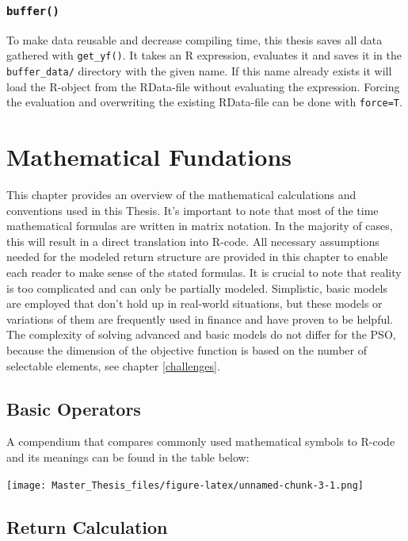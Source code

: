 \documentclass[
  oneside]{book}
\begin{document}
\hypertarget{buffer}{%
\subsection{\texorpdfstring{\texttt{buffer()}}{buffer()}}\label{buffer}}

To make data reusable and decrease compiling time, this thesis saves all data gathered with \texttt{get\_yf()}. It takes an R expression, evaluates it and saves it in the \texttt{buffer\_data/} directory with the given name. If this name already exists it will load the R-object from the RData-file without evaluating the expression. Forcing the evaluation and overwriting the existing RData-file can be done with \texttt{force=T}.

\hypertarget{mathfundations}{%
\chapter{Mathematical Fundations}\label{mathfundations}}

This chapter provides an overview of the mathematical calculations and conventions used in this Thesis. It's important to note that most of the time mathematical formulas are written in matrix notation. In the majority of cases, this will result in a direct translation into R-code. All necessary assumptions needed for the modeled return structure are provided in this chapter to enable each reader to make sense of the stated formulas. It is crucial to note that reality is too complicated and can only be partially modeled. Simplistic, basic models are employed that don't hold up in real-world situations, but these models or variations of them are frequently used in finance and have proven to be helpful. The complexity of solving advanced and basic models do not differ for the PSO, because the dimension of the objective function is based on the number of selectable elements, see chapter \ref{challenges}.

\hypertarget{basic-operators}{%
\section{Basic Operators}\label{basic-operators}}

A compendium that compares commonly used mathematical symbols to R-code and its meanings can be found in the table below:

\texttt{[image: Master\_Thesis\_files/figure-latex/unnamed-chunk-3-1.png]}

\hypertarget{return-calculation}{%
\section{Return Calculation}\label{return-calculation}}
\end{document}
